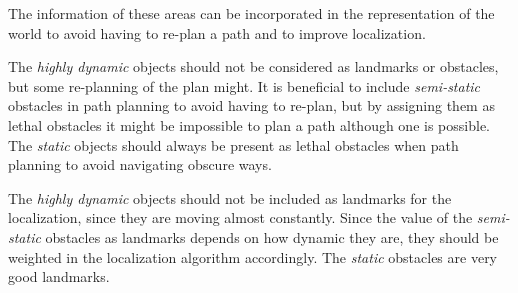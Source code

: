 The information of these areas can be incorporated in the representation of the world to avoid having to re-plan a path and to improve localization. 

The \textit{highly dynamic} objects should not be considered as landmarks or obstacles, but some re-planning of the plan might. It is beneficial to include \textit{semi-static} obstacles in path planning to avoid having to re-plan, but by assigning them as lethal obstacles it might be impossible to plan a path although one is possible. The \textit{static} objects should always be present as lethal obstacles when path planning to avoid navigating obscure ways.

The \textit{highly dynamic} objects should not be included as landmarks for the localization, since they are moving almost constantly. Since the value of the \textit{semi-static} obstacles as landmarks depends on how dynamic they are, they should be weighted in the localization algorithm accordingly. The \textit{static} obstacles are very good landmarks.